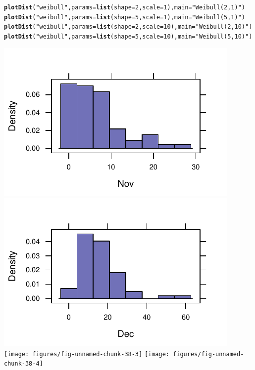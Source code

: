 \documentclass[twoside]{book}\usepackage[]{graphicx}\usepackage[]{xcolor}
\makeatletter
\def\maxwidth{ %
  \ifdim\Gin@nat@width>\linewidth
    \linewidth
  \else
    \Gin@nat@width
  \fi
}
\newcommand{\hlnum}[1]{\textcolor[rgb]{0.686,0.059,0.569}{#1}}%
\newcommand{\hlstr}[1]{\textcolor[rgb]{0.192,0.494,0.8}{#1}}%
\newcommand{\hlstd}[1]{\textcolor[rgb]{0.345,0.345,0.345}{#1}}%
\newcommand{\hlkwc}[1]{\textcolor[rgb]{0.333,0.667,0.333}{#1}}%
\newcommand{\hlkwd}[1]{\textcolor[rgb]{0.737,0.353,0.396}{\textbf{#1}}}%
\newenvironment{kframe}{%
 \def\at@end@of@kframe{}%
 \ifinner\ifhmode%
  \def\at@end@of@kframe{\end{minipage}}%
  \begin{minipage}{\columnwidth}%
 \fi\fi%
 \def\FrameCommand##1{\hskip\@totalleftmargin \hskip-\fboxsep
 \colorbox{shadecolor}{##1}\hskip-\fboxsep
     \hskip-\linewidth \hskip-\@totalleftmargin \hskip\columnwidth}%
 \MakeFramed {\advance\hsize-\width
   \@totalleftmargin\z@ \linewidth\hsize
   \@setminipage}}%
 {\par\unskip\endMakeFramed%
 \at@end@of@kframe}
\newenvironment{knitrout}{}{} %
\makeatother
\begin{document}
\begin{knitrout}
\color{fgcolor}\begin{kframe}
\begin{alltt}
\hlkwd{plotDist}\hlstd{(}\hlstr{"weibull"}\hlstd{,} \hlkwc{params} \hlstd{=} \hlkwd{list}\hlstd{(}\hlkwc{shape} \hlstd{=} \hlnum{2}\hlstd{,} \hlkwc{scale} \hlstd{=} \hlnum{1}\hlstd{),} \hlkwc{main} \hlstd{=} \hlstr{"Weibull(2,1)"}\hlstd{)}
\hlkwd{plotDist}\hlstd{(}\hlstr{"weibull"}\hlstd{,} \hlkwc{params} \hlstd{=} \hlkwd{list}\hlstd{(}\hlkwc{shape} \hlstd{=} \hlnum{5}\hlstd{,} \hlkwc{scale} \hlstd{=} \hlnum{1}\hlstd{),} \hlkwc{main} \hlstd{=} \hlstr{"Weibull(5,1)"}\hlstd{)}
\hlkwd{plotDist}\hlstd{(}\hlstr{"weibull"}\hlstd{,} \hlkwc{params} \hlstd{=} \hlkwd{list}\hlstd{(}\hlkwc{shape} \hlstd{=} \hlnum{2}\hlstd{,} \hlkwc{scale} \hlstd{=} \hlnum{10}\hlstd{),} \hlkwc{main} \hlstd{=} \hlstr{"Weibull(2,10)"}\hlstd{)}
\hlkwd{plotDist}\hlstd{(}\hlstr{"weibull"}\hlstd{,} \hlkwc{params} \hlstd{=} \hlkwd{list}\hlstd{(}\hlkwc{shape} \hlstd{=} \hlnum{5}\hlstd{,} \hlkwc{scale} \hlstd{=} \hlnum{10}\hlstd{),} \hlkwc{main} \hlstd{=} \hlstr{"Weibull(5,10)"}\hlstd{)}
\end{alltt}
\end{kframe}

{\centering \includegraphics[width=\maxwidth]{figures/fig-unnamed-chunk-38-1} 
\includegraphics[width=\maxwidth]{figures/fig-unnamed-chunk-38-2} 
\texttt{[image: figures/fig-unnamed-chunk-38-3]} 
\texttt{[image: figures/fig-unnamed-chunk-38-4]} 

}



\end{knitrout}
\end{document}
